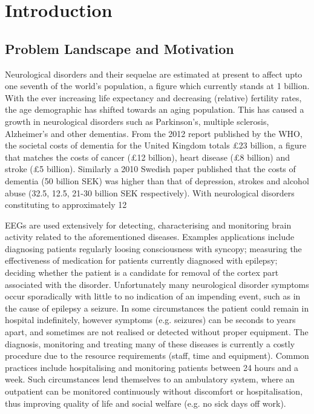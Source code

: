 \documentclass[]{article}
\begin{document}
\clearpage
\section{Introduction}

\subsection{Problem Landscape and Motivation}
Neurological disorders and their sequelae are estimated at present to affect upto one seventh of the world's population, a figure which currently stands at 1 billion. With the ever increasing life expectancy and decreasing (relative) fertility rates, the age demographic has shifted towards an aging population. This has caused a growth in neurological disorders such as Parkinson's, multiple sclerosis, Alzheimer's and other dementias. From the 2012 report published by the \ac{WHO}\cite{WorldHealthOrganization2012}, the societal costs of dementia for the United Kingdom totals £23 billion, a figure that matches the costs of cancer (£12 billion), heart disease (£8 billion) and stroke (£5 billion). Similarly a 2010 Swedish paper published that the costs of dementia (50 billion SEK) was higher than that of depression, strokes and alcohol abuse (32.5, 12.5, 21-30 billion SEK respectively)\cite{Wimo2010}. With neurological disorders constituting to approximately 12%

\ac{EEG}s are used extensively for detecting, characterising and monitoring brain activity related to the aforementioned diseases. Examples applications include diagnosing patients regularly loosing consciousness with syncopy; measuring the effectiveness of medication for patients currently diagnosed with epilepsy\cite{Duncan2006}; deciding whether the patient is a candidate for removal of the cortex part associated with the disorder\cite{Zijlmans2007}. Unfortunately many neurological disorder symptoms occur sporadically with little to no indication of an impending event, such as in the cause of epilepsy a seizure. In some circumstances the patient could remain in hospital indefinitely, however symptoms (e.g. seizures) can be seconds to years apart, and sometimes are not realised or detected without proper equipment. The diagnosis, monitoring and treating many of these diseases is currently a costly procedure due to the resource requirements (staff, time and equipment). Common practices include hospitalising and monitoring patients between 24 hours and a week.  Such circumstances lend themselves to an ambulatory system, where an outpatient can be monitored continuously without discomfort or hospitalisation, thus improving quality of life and social welfare (e.g. no sick days off work).
\end{document}
